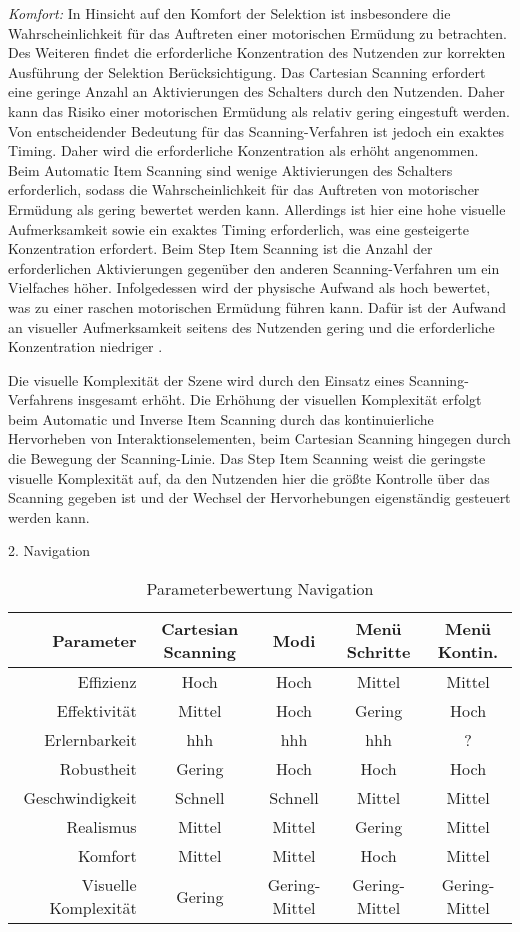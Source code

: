 \textit{Komfort:} 
In Hinsicht auf den Komfort der Selektion ist insbesondere die Wahrscheinlichkeit für das Auftreten einer motorischen Ermüdung zu betrachten. Des Weiteren findet die erforderliche Konzentration des Nutzenden zur korrekten Ausführung der Selektion Berücksichtigung. Das Cartesian Scanning erfordert eine geringe Anzahl an Aktivierungen des Schalters durch den Nutzenden. Daher kann das Risiko einer motorischen Ermüdung als relativ gering eingestuft werden. Von entscheidender Bedeutung für das Scanning-Verfahren ist jedoch ein exaktes Timing. Daher wird die erforderliche Konzentration als erhöht angenommen. 
Beim Automatic Item Scanning sind wenige Aktivierungen des Schalters erforderlich, sodass die Wahrscheinlichkeit für das Auftreten von motorischer Ermüdung als gering bewertet werden kann. Allerdings ist hier eine hohe visuelle Aufmerksamkeit sowie ein exaktes Timing erforderlich, was eine gesteigerte Konzentration erfordert. Beim Step Item Scanning ist die Anzahl der erforderlichen Aktivierungen gegenüber den anderen Scanning-Verfahren um ein Vielfaches höher. Infolgedessen wird der physische Aufwand als hoch bewertet, was zu einer raschen motorischen Ermüdung führen kann. Dafür ist der Aufwand an visueller Aufmerksamkeit seitens des Nutzenden gering und die erforderliche Konzentration niedriger \citep{COOK2015117}. 

Die visuelle Komplexität der Szene wird durch den Einsatz eines Scanning-Verfahrens insgesamt erhöht. Die Erhöhung der visuellen Komplexität erfolgt beim Automatic und Inverse Item Scanning durch das kontinuierliche Hervorheben von Interaktionselementen, beim Cartesian Scanning hingegen durch die Bewegung der Scanning-Linie. Das Step Item Scanning weist die geringste visuelle Komplexität auf, da den Nutzenden hier die größte Kontrolle über das Scanning gegeben ist und der Wechsel der Hervorhebungen eigenständig gesteuert werden kann.

2. Navigation 

\begin{table}[ht]
 \centering
 \begin{tabular}{r|c|c|c|c} 
 Parameter & Cartesian Scanning & Modi & Menü Schritte & Menü Kontin.\\
 \hline
 Effizienz & Hoch & Hoch & Mittel & Mittel\\
 Effektivität & Mittel & Hoch & Gering & Hoch\\
 Erlernbarkeit & hhh & hhh & hhh & ?\\
 Robustheit & Gering & Hoch & Hoch & Hoch\\
 Geschwindigkeit & Schnell & Schnell & Mittel & Mittel\\
 Realismus & Mittel & Mittel & Gering & Mittel \\
 Komfort & Mittel & Mittel & Hoch & Mittel\\
 Visuelle Komplexität & Gering & Gering-Mittel & Gering-Mittel & Gering-Mittel
 \end{tabular}
 \caption{Parameterbewertung Navigation}
 \label{tab:Navi}
\end{table}

